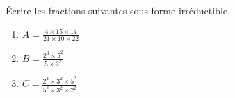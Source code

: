 
Écrire les fractions suivantes sous forme irréductible.

  \begin{enumerate}
    \item $A=\frac{4 \times 15 \times 14}{21 \times 10 \times 22}$
    \item $B=\frac{2^3 \times 5^2 }{5 \times 2^2}$
    \item $C=\frac{2^4 \times 3^2 \times 5^2 }{5^3 \times 3^2 \times 2^2}$
  \end{enumerate}


